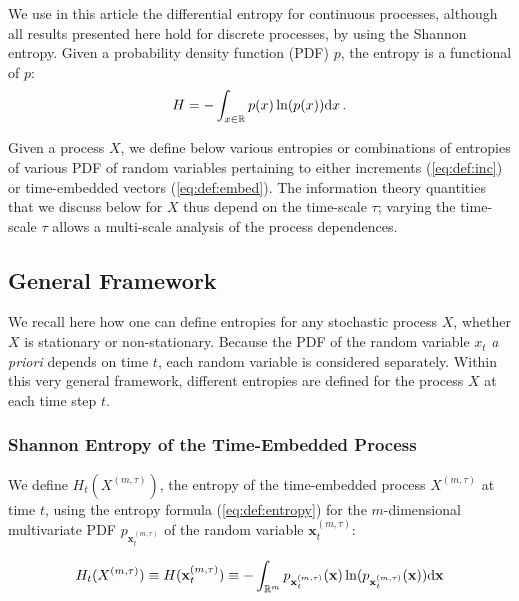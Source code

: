 \documentclass[aps,pra,groupedaddress,notitlepage]{revtex4-1}
\begin{document}
We use in this article the differential entropy for continuous processes, although all results presented here hold for discrete processes, by using the Shannon entropy. Given a probability density function (PDF) $p$, the entropy is a functional of $p$:
\begin{equation}
H = -\int_{x\in{\mathbb R}} p(x) \ln(p(x)) {\rm d}x \,. \label{eq:def:entropy}
\end{equation}

Given a process $X$, we define below various entropies or combinations of entropies of various PDF of random variables pertaining to either increments (\ref{eq:def:inc}) or time-embedded vectors (\ref{eq:def:embed}).
The information theory quantities that we discuss below for $X$ thus depend on the time-scale $\tau$; varying the time-scale $\tau$ allows a multi-scale analysis of the process dependences. 


\subsection{General Framework}

We recall here how one can define entropies for any stochastic process $X$, whether $X$ is stationary or non-stationary. Because the PDF of the random variable $x_t$ {\em a priori} depends on time $t$, each random variable is considered separately.
Within this very general framework, different entropies are defined for the process $X$ at each time step $t$.


\subsubsection{{Shannon} Entropy of the Time-Embedded Process}

We define $H_t(X^{(m,\tau)})$, the entropy of the time-embedded process $X^{(m,\tau)}$ at time $t$, using the entropy formula (\ref{eq:def:entropy}) for the $m$-dimensional multivariate PDF $p_{\textbf{x}_t^{(m,\tau)}}$ of the random variable $\textbf{x}_t^{(m,\tau)}$:

\begin{equation}
H_t(X^{(m,\tau)})\equiv H(\textbf{x}_t^{(m,\tau)}) \equiv-\int_{\mathbb{R}^{m}} p_{\textbf{x}_t^{(m,\tau)}}(\textbf{x}) \ln(p_{\textbf{x}_t^{(m,\tau)}}(\textbf{x})) {\rm d}\textbf{x}
\label{eq:entropy:abstract}
\end{equation}
\end{document}
